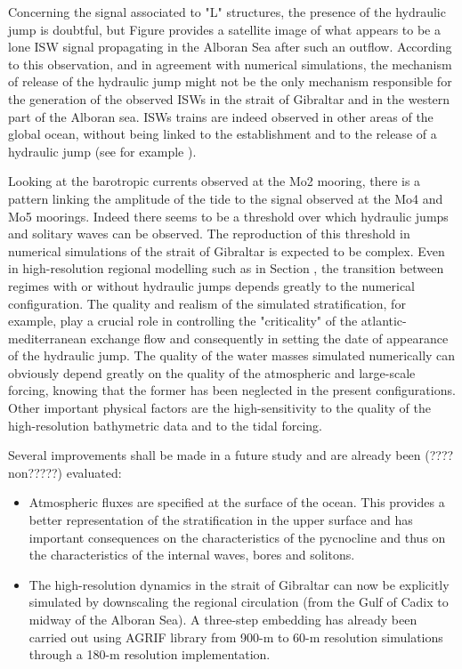 Concerning the signal associated to "L" structures, the presence of the hydraulic jump is doubtful, but Figure  provides a satellite image of what appears to be a lone ISW signal propagating in the Alboran Sea after such an outflow. According to this observation, and in agreement with numerical simulations, the mechanism of release of the hydraulic jump might not be the only mechanism responsible for the generation of the observed ISWs in the strait of Gibraltar and in the western part of the Alboran sea. ISWs trains are indeed observed in other areas of the global ocean, without being linked to the establishment and to the release of a hydraulic jump (see for example \citet{chen_2017}).

Looking at the barotropic currents observed at the Mo2 mooring, there is a pattern linking the amplitude of the tide to the signal observed at the Mo4 and Mo5 moorings. Indeed there seems to be a threshold over which hydraulic jumps and solitary waves can be observed. The reproduction of this threshold in numerical simulations of the strait of Gibraltar is expected to be complex. Even in high-resolution regional modelling such as in Section , the transition between regimes with or without hydraulic jumps depends greatly to the numerical configuration. The quality and realism of the simulated stratification, for example, play a crucial role in controlling the "criticality" of the atlantic-mediterranean exchange flow and consequently in setting the date of appearance of the hydraulic jump. The quality of the water masses simulated numerically can obviously depend greatly on the quality of the atmospheric and large-scale forcing, knowing that the former has been neglected in the present configurations. Other important physical factors are the high-sensitivity to the quality of the high-resolution bathymetric data and to the tidal forcing.

Several improvements shall be made in a future study and \color{red}are already been (????non?????)\color{black} evaluated: 
\begin{itemize}
\item Atmospheric fluxes are specified at the surface of the ocean.  This provides a better representation of the stratification in the upper surface and has important consequences on the characteristics of the pycnocline and thus on the characteristics of the internal waves, bores and solitons.
\item The high-resolution dynamics in the strait of Gibraltar can now be explicitly simulated by downscaling the regional circulation (from the Gulf of Cadix to midway of the Alboran Sea). A three-step embedding has already been carried out using AGRIF library from 900-m to 60-m resolution simulations through a 180-m resolution implementation.
\end{itemize}
 
